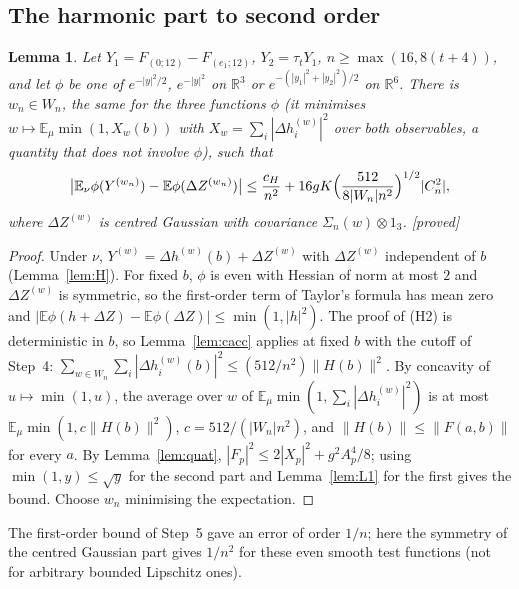 \documentclass[11pt,a4paper]{article}
\theoremstyle{plain}
\newtheorem{lemma}[theorem]{Lemma}
\theoremstyle{definition}
\theoremstyle{remark}
\numberwithin{equation}{section}
\newcommand{\R}{\mathbb{R}}
\newcommand{\E}{\mathbb{E}}
\newcommand{\st}[1]{\textsf{[#1]}}
\begin{document}
\subsection{The harmonic part to second order}
\begin{lemma}\label{lem:H2}
Let $Y_1=F_{(0;12)}-F_{(e_1;12)}$, $Y_2=\tau_tY_1$, $n\ge\max(16,8(t+4))$, and let $\phi$ be one of $e^{-|y|^2/2}$, $e^{-|y|^2}$ on $\R^3$ or
$e^{-(|y_1|^2+|y_2|^2)/2}$ on $\R^6$. There is $w_n\in W_n$, the same for the three functions $\phi$ (it minimises $w\mapsto\E_\mu\min(1,X_w(b))$ with $X_w=\sum_i|\Delta h_i^{(w)}|^2$ over both observables, a quantity that does not involve $\phi$), such that
\[
\bigl|\E_\nu\phi(Y^{(w_n)})-\E\phi(\Delta Z^{(w_n)})\bigr|\le\frac{c_H}{n^2}+16gK\Bigl(\frac{512}{8|W_n|n^2}\Bigr)^{1/2}|C^2_n|,
\]
where $\Delta Z^{(w)}$ is centred Gaussian with covariance $\Sigma_n(w)\otimes1_3$. \st{proved}
\end{lemma}
\begin{proof}
Under $\nu$, $Y^{(w)}=\Delta h^{(w)}(b)+\Delta Z^{(w)}$ with $\Delta Z^{(w)}$ independent of $b$ (Lemma~\ref{lem:H}). For fixed $b$, $\phi$ is even with
Hessian of norm at most $2$ and $\Delta Z^{(w)}$ is symmetric, so the first-order term of Taylor's formula has mean zero and
$|\E\phi(h+\Delta Z)-\E\phi(\Delta Z)|\le\min(1,|h|^2)$. The proof of (H2) is deterministic in $b$, so Lemma~\ref{lem:cacc} applies at fixed $b$
with the cutoff of Step~4: $\sum_{w\in W_n}\sum_i|\Delta h_i^{(w)}(b)|^2\le(512/n^2)\|H(b)\|^2$. By concavity of $u\mapsto\min(1,u)$,
the average over $w$ of $\E_\mu\min(1,\sum_i|\Delta h_i^{(w)}|^2)$ is at most $\E_\mu\min(1,c\|H(b)\|^2)$, $c=512/(|W_n|n^2)$, and
$\|H(b)\|\le\|F(a,b)\|$ for every $a$. By Lemma~\ref{lem:quat}, $|F_p|^2\le2|X_p|^2+g^2A_p^4/8$; using $\min(1,y)\le\sqrt y$ for the second
part and Lemma~\ref{lem:L1} for the first gives the bound. Choose $w_n$ minimising the expectation.
\end{proof}
The first-order bound of Step~5 gave an error of order $1/n$; here the symmetry of the centred Gaussian part gives $1/n^2$ for these even
smooth test functions (not for arbitrary bounded Lipschitz ones).
\end{document}

